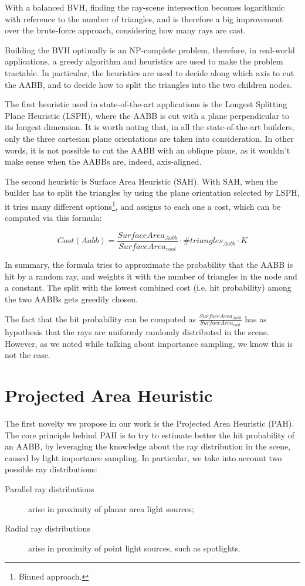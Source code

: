 \documentclass[11pt,a4paper,twocolumn]{article}
\begin{document}
With a balanced BVH, finding the ray-scene intersection becomes logarithmic with reference to the number of triangles, and is therefore a big improvement over the brute-force approach, considering how many rays are cast.

Building the BVH optimally is an NP-complete problem, therefore, in real-world applications, a greedy algorithm and heuristics are used to make the problem tractable. In particular, the heuristics are used to decide along which axis to cut the AABB, and to decide how to split the triangles into the two children nodes.

The first heuristic used in state-of-the-art applications is the Longest Splitting Plane Heuristic (LSPH), where the AABB is cut with a plane perpendicular to its longest dimension. It is worth noting that, in all the state-of-the-art builders, only the three cartesian plane orientations are taken into consideration. In other words, it is not possible to cut the AABB with an oblique plane, as it wouldn't make sense when the AABBs are, indeed, axis-aligned.

The second heuristic is Surface Area Heuristic (SAH). With SAH, when the builder has to split the triangles by using the plane orientation selected by LSPH, it tries many different options\footnote{Binned approach.}, and assigns to each one a cost, which can be computed via this formula:

$$
Cost(Aabb) = \frac{SurfaceArea_{Aabb}}{SurfaceArea_{root}} \cdot \#triangles_{Aabb} \cdot K
$$

In summary, the formula tries to approximate the probability that the AABB is hit by a random ray, and weights it with the number of triangles in the node and a constant. The split with the lowest combined cost (i.e. hit probability) among the two AABBs gets greedily chosen.

The fact that the hit probability can be computed as $\frac{SurfaceArea_{Aabb}}{SurfaceArea_{root}}$ has as hypothesis that the rays are uniformly randomly distributed in the scene. However, as we noted while talking about importance sampling, we know this is not the case.

\section{Projected Area Heuristic}
The first novelty we propose in our work is the Projected Area Heuristic (PAH). The core principle behind PAH is to try to estimate better the hit probability of an AABB, by leveraging the knowledge about the ray distribution in the scene, caused by light importance sampling. In particular, we take into account two possible ray distributions:
\begin{description}
    \item[Parallel ray distributions] arise in proximity of planar area light sources;
    \item[Radial ray distributions] arise in proximity of point light sources, such as spotlights. 
\end{description}
\end{document}
